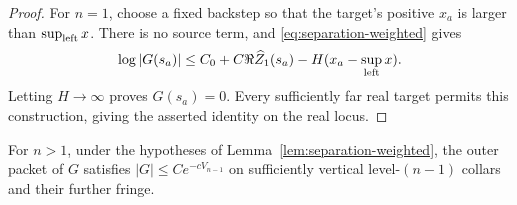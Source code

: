\begin{proof}
For $n=1$, choose a fixed backstep so that the target's positive
$x_a$ is larger than $\sup_{\rm left}x$.
There is no source term, and
\eqref{eq:separation-weighted} gives
\[
 \log|G(s_a)|\leq C_0+C\Re\widehat Z_1(s_a)
              -H(x_a-\sup_{\rm left}x).
\]
Letting $H\to\infty$ proves $G(s_a)=0$.  Every sufficiently
far real target permits this construction, giving the asserted
identity on the real locus.
\end{proof}

\begin{lemma}
\label{lem:separation-upgrade}
For $n>1$, under the hypotheses of
Lemma~\ref{lem:separation-weighted}, the outer packet of $G$
satisfies $|G|\leq Ce^{-cV_{n-1}}$ on sufficiently vertical
level-$(n-1)$ collars and their further fringe.
\end{lemma}

